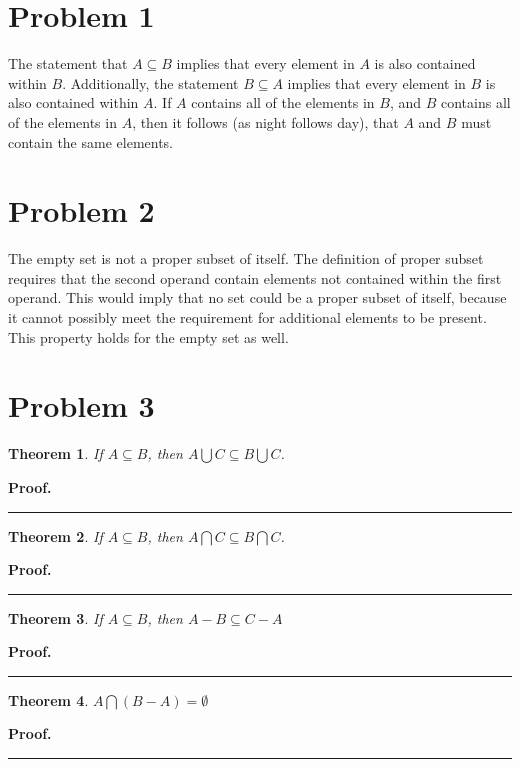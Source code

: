 \documentclass{article}%
\newtheorem{theorem}{Theorem}
\newenvironment{proof}[1][Proof]{\noindent\textbf{#1.} }{\ \rule{0.5em}{0.5em}}
\begin{document}
\section*{Problem 1}


The statement that $A \subseteq B$ implies that every element in $A$ is also contained within $B$. Additionally, the statement
$B \subseteq A$ implies that every element in $B$ is also contained within $A$. If $A$ contains all of the elements in $B$, and
$B$ contains all of the elements in $A$, then it follows (as night follows day), that $A$ and $B$ must contain the same elements.

\section*{Problem 2}


The empty set is not a proper subset of itself. The definition of proper subset requires that the second operand contain elements not
contained within the first operand. This would imply that no set could be a proper subset of itself, because it cannot possibly meet
the requirement for additional elements to be present. This property holds for the empty set as well.

\section*{Problem 3}


\begin{theorem}
    If $A \subseteq B$, then $A \bigcup C \subseteq B \bigcup C$.
\end{theorem}

\begin{proof}
\end{proof}

\begin{theorem}
    If $A \subseteq B$, then $A \bigcap C \subseteq B \bigcap C$.
\end{theorem}

\begin{proof}
\end{proof}

\begin{theorem}
    If $A \subseteq B$, then $A - B \subseteq C - A$
\end{theorem}

\begin{proof}
\end{proof}

\begin{theorem}
    $A \bigcap (B - A) = \emptyset$
\end{theorem}

\begin{proof}
\end{proof}
\end{document}
